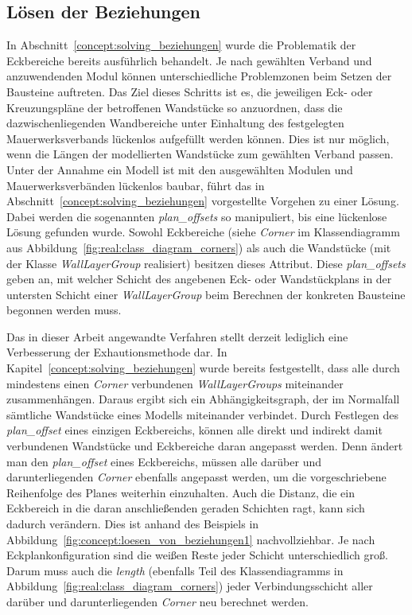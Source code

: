 \subsection*{Lösen der Beziehungen}
In Abschnitt~\ref{concept:solving_beziehungen} wurde die Problematik der Eckbereiche bereits ausführlich behandelt.
Je nach gewählten Verband und anzuwendenden Modul können unterschiedliche Problemzonen beim Setzen der Bausteine auftreten.
Das Ziel dieses Schritts ist es, die jeweiligen Eck- oder Kreuzungspläne der betroffenen Wandstücke so anzuordnen, dass die dazwischenliegenden Wandbereiche unter Einhaltung des festgelegten Mauerwerksverbands lückenlos aufgefüllt werden können.
Dies ist nur möglich, wenn die Längen der modellierten Wandstücke zum gewählten Verband passen.
Unter der Annahme ein Modell ist mit den ausgewählten Modulen und Mauerwerksverbänden lückenlos baubar, führt das in Abschnitt~\ref{concept:solving_beziehungen} vorgestellte Vorgehen zu einer Lösung. 
Dabei werden die sogenannten \textit{plan\_offsets} so manipuliert, bis eine lückenlose Lösung gefunden wurde.
Sowohl Eckbereiche (siehe \textit{Corner} im Klassendiagramm aus Abbildung~\ref{fig:real:class_diagram_corners}) als auch die Wandstücke (mit der Klasse \textit{WallLayerGroup} realisiert) besitzen dieses Attribut.
Diese \textit{plan\_offsets} geben an, mit welcher Schicht des angebenen Eck- oder Wandstückplans in der untersten Schicht einer \textit{WallLayerGroup} beim Berechnen der konkreten Bausteine begonnen werden muss.

Das in dieser Arbeit angewandte Verfahren stellt derzeit lediglich eine Verbesserung der Exhautionsmethode dar.
In Kapitel~\ref{concept:solving_beziehungen} wurde bereits festgestellt, dass alle durch mindestens einen \textit{Corner} verbundenen \textit{WallLayerGroups} miteinander zusammenhängen.
Daraus ergibt sich ein Abhängigkeitsgraph, der im Normalfall sämtliche Wandstücke eines Modells miteinander verbindet.
Durch Festlegen des \textit{plan\_offset} eines einzigen Eckbereichs, können alle direkt und indirekt damit verbundenen Wandstücke und Eckbereiche daran angepasst werden.
Denn ändert man den \textit{plan\_offset} eines Eckbereichs, müssen alle darüber und darunterliegenden \textit{Corner} ebenfalls angepasst werden, um die vorgeschriebene Reihenfolge des Planes weiterhin einzuhalten.
Auch die Distanz, die ein Eckbereich in die daran anschließenden geraden Schichten ragt, kann sich dadurch verändern.
Dies ist anhand des Beispiels in Abbildung~\ref{fig:concept:loesen_von_beziehungen1} nachvollziehbar.
Je nach Eckplankonfiguration sind die weißen Reste jeder Schicht unterschiedlich groß.
Darum muss auch die \textit{length} (ebenfalls Teil des Klassendiagramms in Abbildung~\ref{fig:real:class_diagram_corners}) jeder Verbindungsschicht aller darüber und darunterliegenden \textit{Corner} neu berechnet werden.

